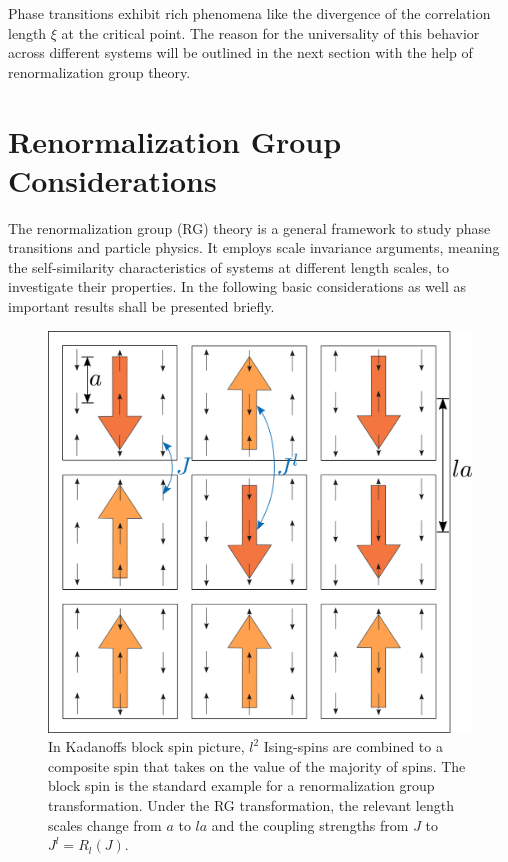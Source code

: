 	Phase transitions exhibit rich phenomena like the divergence of the correlation length $\xi$ at the critical point. The reason for the universality of this behavior across different systems will be outlined in the next section with the help of renormalization group theory.
	\section{Renormalization Group Considerations} \label{Section::RG}
	The renormalization group (RG) theory is a general framework to study phase transitions and particle physics. It employs scale invariance arguments, meaning the self-similarity characteristics of systems at different length scales, to investigate their properties. In the following basic considerations as well as important results shall be presented briefly. \\
	\begin{figure}[t]
		\centering
		\includegraphics[width=0.7\linewidth]{graphics/RG-Iteration.png}
		\caption{In Kadanoffs block spin picture, $l^2$ Ising-spins are combined to a composite spin that takes on the value of the majority of spins. The block spin is the standard example for a renormalization group transformation. Under the RG transformation, the relevant length scales change from $a$ to $la$ and the coupling strengths from $J$ to $J^l =	R_l(J)$.}
		\label{Fig::RG-Iteration}
	\end{figure}
	
